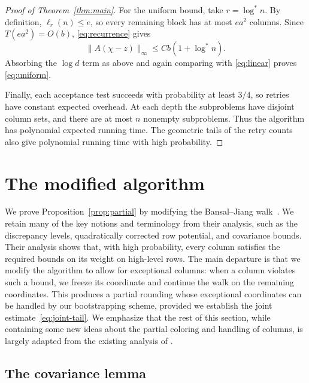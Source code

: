 \documentclass[reqno]{amsart}
\theoremstyle{definition}
\newcommand{\norm}[1]{\lVert#1\rVert}
\newcommand{\lstar}{\log^*}
\begin{document}
\begin{proof}[Proof of Theorem~\ref{thm:main}]
For the uniform bound, take $r=\lstar n$. By definition, $\ell_r(n)\le e$, so every remaining block has at most $ea^2$ columns. Since $T(ea^2)=O(b)$, \eqref{eq:recurrence} gives
\[ \norm{A(\chi-z)}_\infty\le Cb(1+\lstar n). \]
Absorbing the $\log d$ term as above and again comparing with \eqref{eq:linear} proves \eqref{eq:uniform}.

Finally, each acceptance test succeeds with probability at least $3/4$, so retries have constant expected overhead. At each depth the subproblems have disjoint column sets, and there are at most $n$ nonempty subproblems. Thus the algorithm has polynomial expected running time. The geometric tails of the retry counts also give polynomial running time with high probability.
\end{proof}



\section{The modified algorithm}\label{sec:joint}

We prove Proposition~\ref{prop:partial} by modifying the Bansal--Jiang walk~\cite[Section~5]{BJ}. We retain many of the key notions and terminology from their analysis, such as the discrepancy levels, quadratically corrected row potential, and covariance bounds. Their analysis shows that, with high probability, every column satisfies the required bounds on its weight on high-level rows. The main departure is that we modify the algorithm to allow for exceptional columns: when a column violates such a bound, we freeze its coordinate and continue the walk on the remaining coordinates. This produces a partial rounding whose exceptional coordinates can be handled by our bootstrapping scheme, provided we establish the joint estimate~\eqref{eq:joint-tail}. We emphasize that the rest of this section, while containing some new ideas about the partial coloring and handling of columns, is largely adapted from the existing analysis of \cite{BJ}.

\subsection{The covariance lemma}
\end{document}
